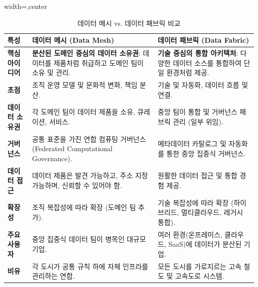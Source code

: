 \documentclass[11pt,a4paper]{article}
\theoremstyle{definition}
\begin{document}
\begin{table}[htbp]
\centering
\caption{데이터 메시 vs. 데이터 패브릭 비교}
\label{tab:mesh_vs_fabric}
\begin{adjustbox}{width=\textwidth,center}
\begin{tabular}{p{3cm} p{6.5cm} p{6.5cm}}
\toprule
\textbf{특성} & \textbf{데이터 메시 (Data Mesh)} & \textbf{데이터 패브릭 (Data Fabric)} \\
\midrule
\textbf{핵심 아이디어} & \textbf{분산된 도메인 중심의 데이터 소유권}: 데이터를 제품처럼 취급하고 도메인 팀이 소유 및 관리. & \textbf{기술 중심의 통합 아키텍처}: 다양한 데이터 소스를 통합하여 단일 환경처럼 제공. \\
\textbf{초점} & 조직 운영 모델 및 문화적 변화, 책임 분산. & 기술 및 자동화, 데이터 흐름 및 연결. \\
\textbf{데이터 소유권} & 각 도메인 팀이 데이터 제품을 소유, 큐레이션, 서비스. & 중앙 팀이 통합 및 거버넌스 패브릭 관리 (일부 위임). \\
\textbf{거버넌스} & 공통 표준을 가진 연합 컴퓨팅 거버넌스 (Federated Computational Governance). & 메타데이터 카탈로그 및 자동화를 통한 중앙 집중식 거버넌스. \\
\textbf{데이터 접근} & 데이터 제품은 발견 가능하고, 주소 지정 가능하며, 신뢰할 수 있어야 함. & 원활한 데이터 접근 및 통합 경험 제공. \\
\textbf{확장성} & 조직 복잡성에 따라 확장 (도메인 팀 추가). & 기술 복잡성에 따라 확장 (하이브리드, 멀티클라우드, 레거시 통합). \\
\textbf{주요 사용자} & 중앙 집중식 데이터 팀이 병목인 대규모 기업. & 여러 환경(온프레미스, 클라우드, SaaS)에 데이터가 분산된 기업. \\
\textbf{비유} & 각 도시가 공통 규칙 하에 자체 인프라를 관리하는 연합. & 모든 도시를 가로지르는 고속 철도 및 고속도로 시스템. \\
\bottomrule
\end{tabular}
\end{adjustbox}
\end{table}
\end{document}
